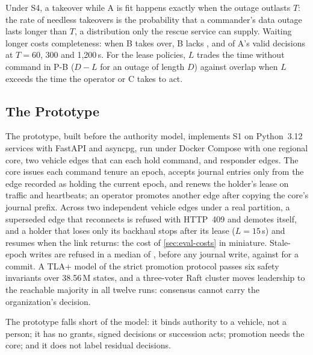 Under S4, a takeover while A is fit happens exactly when the outage outlasts $T$: the rate
of needless takeovers is the probability that a commander's data outage lasts longer than
$T$, a distribution only the rescue service can supply. Waiting longer costs completeness:
when B takes over, B lacks \tbBlindSixty{}, \tbBlindThreeHundred{} and \tbBlindTwelveHundred{}
of A's valid decisions at $T = 60$, 300 and 1{,}200\,s. For the lease policies, $L$ trades the
time without command in P-B ($D - L$ for an outage of length $D$) against overlap when $L$
exceeds the time the operator or C takes to act. 

\subsection{The Prototype}
\label{sec:eval-prototype}

The prototype, built before the authority model, implements S1 on Python~3.12 services
with FastAPI and asyncpg, run under Docker Compose with one regional core, two vehicle
edges that can each hold command, and responder edges. The core issues each command tenure
an epoch, accepts journal entries only from the edge recorded as holding the current epoch,
and renews the holder's lease on traffic and heartbeats; an operator promotes another edge
after copying the core's journal prefix. Across two independent vehicle edges under a real
partition, a superseded edge that reconnects is refused with HTTP~409 and demotes itself,
and a holder that loses only its backhaul stops after its lease ($L = 15$\,s) and resumes
when the link returns: the cost of \cref{sec:eval-costs} in miniature. Stale-epoch writes are
refused in a median of \promotionMedianB{}, before any journal write, against
\promotionMedianA{} for a commit. A TLA+ model of the strict promotion protocol passes six
safety invariants over 38.56\,M states, and a three-voter Raft cluster moves leadership to
the reachable majority in all twelve runs: consensus cannot carry the organization's
decision. 

The prototype falls short of the model: it binds authority to a vehicle, not a person; it
has no grants, signed decisions or succession acts; promotion needs the core; and it does
not label residual decisions. 

